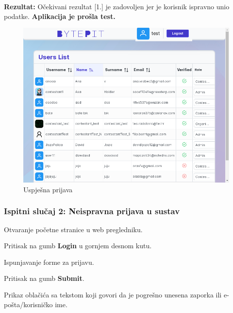 			\noindent \textbf{Rezultat:} Očekivani rezultat [1.] je zadovoljen jer je korisnik ispravno unio podatke. \textbf{Aplikacija je prošla test.}
			
			\begin{figure}[H]
				\includegraphics[scale=0.50]{slike/screenshot_test_result.PNG}
				\centering
				\caption{Uspješna prijava}
				\label{fig:sucess_login}
			\end{figure}
			
			\eject
			
			\subsubsection{Ispitni slučaj 2: Neispravna prijava u sustav}
			
			
			\begin{packed_enum}
				
				\item  Otvaranje početne stranice u web pregledniku.
				\item  Pritisak na gumb \textbf{Login} u gornjem desnom kutu.
				\item  Ispunjavanje forme za prijavu.
				\item  Pritisak na gumb \textbf{Submit}. 
				
			\end{packed_enum}
			
			\begin{packed_enum}
				
				\item  Prikaz oblačića sa tekstom koji govori da je pogrešno unesena zaporka ili e-pošta/korisničko ime. 
				
			\end{packed_enum}
			
